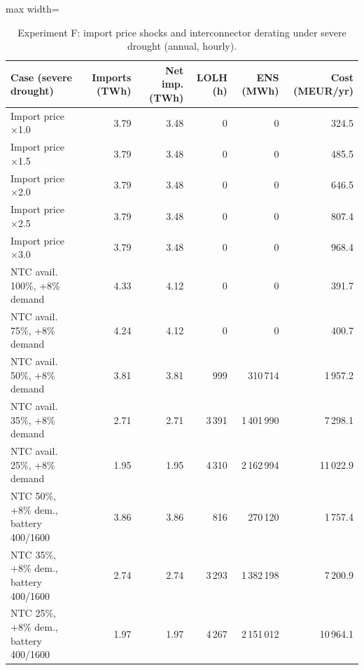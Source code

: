 \begin{table}[htbp]
\centering
\footnotesize
\caption{Experiment F: import price shocks and interconnector derating under severe drought (annual, hourly).}
\label{tab:exp-F}
\begin{adjustbox}{max width=\linewidth}
\begin{tabular}{lrrrrr}
\toprule
Case (severe drought) & Imports (TWh) & Net imp. (TWh) & LOLH (h) & ENS (MWh) & Cost (MEUR/yr) \\
\midrule
Import price ×1.0 & 3.79 & 3.48 & 0 & 0 & 324.5 \\
Import price ×1.5 & 3.79 & 3.48 & 0 & 0 & 485.5 \\
Import price ×2.0 & 3.79 & 3.48 & 0 & 0 & 646.5 \\
Import price ×2.5 & 3.79 & 3.48 & 0 & 0 & 807.4 \\
Import price ×3.0 & 3.79 & 3.48 & 0 & 0 & 968.4 \\
NTC avail. 100\%, +8\% demand & 4.33 & 4.12 & 0 & 0 & 391.7 \\
NTC avail. 75\%, +8\% demand & 4.24 & 4.12 & 0 & 0 & 400.7 \\
NTC avail. 50\%, +8\% demand & 3.81 & 3.81 & 999 & 310\,714 & 1\,957.2 \\
NTC avail. 35\%, +8\% demand & 2.71 & 2.71 & 3\,391 & 1\,401\,990 & 7\,298.1 \\
NTC avail. 25\%, +8\% demand & 1.95 & 1.95 & 4\,310 & 2\,162\,994 & 11\,022.9 \\
NTC 50\%, +8\% dem., battery 400/1600 & 3.86 & 3.86 & 816 & 270\,120 & 1\,757.4 \\
NTC 35\%, +8\% dem., battery 400/1600 & 2.74 & 2.74 & 3\,293 & 1\,382\,198 & 7\,200.9 \\
NTC 25\%, +8\% dem., battery 400/1600 & 1.97 & 1.97 & 4\,267 & 2\,151\,012 & 10\,964.1 \\
\bottomrule
\end{tabular}
\end{adjustbox}
\end{table}
